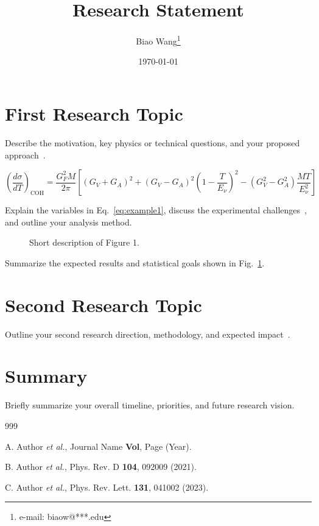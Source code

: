 \documentclass[11pt, a4paper]{article}
\title{Research Statement}
\author{Biao Wang\thanks{e-mail: biaow@***.edu}}
\date{\today}
\begin{document}
\maketitle


\section{First Research Topic}

Describe the motivation, key physics or technical questions, and your proposed approach~\cite{ref1}.

\begin{equation}
  \left(\frac{d\sigma}{dT}\right)_{\mathrm{COH}} = \frac{G_{F}^{2} M}{2\pi} \left[ (G_{V}+G_{A})^{2} + (G_{V}-G_{A})^{2}\left(1 - \frac{T}{E_{\nu}}\right)^{2} - (G_{V}^{2}-G_{A}^{2})\frac{M T}{E_{\nu}^{2}} \right]
  \label{eq:example1}
\end{equation}

Explain the variables in Eq.~\eqref{eq:example1}, discuss the experimental challenges~\cite{ref2}, and outline your analysis method.

\begin{figure}[htbp]
  \centering
  \caption{Short description of Figure 1.}
  \label{fig:fig1}
\end{figure}

Summarize the expected results and statistical goals shown in Fig.~\ref{fig:fig1}.

\section{Second Research Topic}

Outline your second research direction, methodology, and expected impact~\cite{ref3}.

\section*{Summary}

Briefly summarize your overall timeline, priorities, and future research vision.

\begin{thebibliography}{999}

A. Author \textit{et al.}, Journal Name \textbf{Vol}, Page (Year).

B. Author \textit{et al.}, Phys. Rev. D \textbf{104}, 092009 (2021).

C. Author \textit{et al.}, Phys. Rev. Lett. \textbf{131}, 041002 (2023).

\end{thebibliography}
\end{document}

